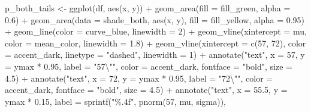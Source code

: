 \documentclass[
  letterpaper,
  DIV=11,
  numbers=noendperiod]{scrreprt}
\newenvironment{Shaded}{\begin{snugshade}}{\end{snugshade}}
\newcommand{\AttributeTok}[1]{\textcolor[rgb]{0.40,0.45,0.13}{#1}}
\newcommand{\DecValTok}[1]{\textcolor[rgb]{0.68,0.00,0.00}{#1}}
\newcommand{\FloatTok}[1]{\textcolor[rgb]{0.68,0.00,0.00}{#1}}
\newcommand{\FunctionTok}[1]{\textcolor[rgb]{0.28,0.35,0.67}{#1}}
\newcommand{\NormalTok}[1]{\textcolor[rgb]{0.00,0.23,0.31}{#1}}
\newcommand{\OtherTok}[1]{\textcolor[rgb]{0.00,0.23,0.31}{#1}}
\newcommand{\SpecialCharTok}[1]{\textcolor[rgb]{0.37,0.37,0.37}{#1}}
\newcommand{\StringTok}[1]{\textcolor[rgb]{0.13,0.47,0.30}{#1}}
\begin{document}
\begin{Shaded}
\begin{Highlighting}[]
\NormalTok{p\_both\_tails }\OtherTok{\textless{}{-}} \FunctionTok{ggplot}\NormalTok{(df, }\FunctionTok{aes}\NormalTok{(x, y)) }\SpecialCharTok{+}
  \FunctionTok{geom\_area}\NormalTok{(}\AttributeTok{fill =}\NormalTok{ fill\_green, }\AttributeTok{alpha =} \FloatTok{0.6}\NormalTok{) }\SpecialCharTok{+}
  \FunctionTok{geom\_area}\NormalTok{(}\AttributeTok{data =}\NormalTok{ shade\_both, }\FunctionTok{aes}\NormalTok{(x, y), }\AttributeTok{fill =}\NormalTok{ fill\_yellow, }\AttributeTok{alpha =} \FloatTok{0.95}\NormalTok{) }\SpecialCharTok{+}
  \FunctionTok{geom\_line}\NormalTok{(}\AttributeTok{color =}\NormalTok{ curve\_blue, }\AttributeTok{linewidth =} \DecValTok{2}\NormalTok{) }\SpecialCharTok{+}
  \FunctionTok{geom\_vline}\NormalTok{(}\AttributeTok{xintercept =}\NormalTok{ mu, }\AttributeTok{color =}\NormalTok{ mean\_color, }\AttributeTok{linewidth =} \FloatTok{1.8}\NormalTok{) }\SpecialCharTok{+}
  \FunctionTok{geom\_vline}\NormalTok{(}\AttributeTok{xintercept =} \FunctionTok{c}\NormalTok{(}\DecValTok{57}\NormalTok{, }\DecValTok{72}\NormalTok{), }\AttributeTok{color =}\NormalTok{ accent\_dark, }
             \AttributeTok{linetype =} \StringTok{"dashed"}\NormalTok{, }\AttributeTok{linewidth =} \DecValTok{1}\NormalTok{) }\SpecialCharTok{+}
  \FunctionTok{annotate}\NormalTok{(}\StringTok{"text"}\NormalTok{, }\AttributeTok{x =} \DecValTok{57}\NormalTok{, }\AttributeTok{y =}\NormalTok{ ymax }\SpecialCharTok{*} \FloatTok{0.95}\NormalTok{, }\AttributeTok{label =} \StringTok{"57}\SpecialCharTok{\textbackslash{}"}\StringTok{"}\NormalTok{, }
           \AttributeTok{color =}\NormalTok{ accent\_dark, }\AttributeTok{fontface =} \StringTok{"bold"}\NormalTok{, }\AttributeTok{size =} \FloatTok{4.5}\NormalTok{) }\SpecialCharTok{+}
  \FunctionTok{annotate}\NormalTok{(}\StringTok{"text"}\NormalTok{, }\AttributeTok{x =} \DecValTok{72}\NormalTok{, }\AttributeTok{y =}\NormalTok{ ymax }\SpecialCharTok{*} \FloatTok{0.95}\NormalTok{, }\AttributeTok{label =} \StringTok{"72}\SpecialCharTok{\textbackslash{}"}\StringTok{"}\NormalTok{, }
           \AttributeTok{color =}\NormalTok{ accent\_dark, }\AttributeTok{fontface =} \StringTok{"bold"}\NormalTok{, }\AttributeTok{size =} \FloatTok{4.5}\NormalTok{) }\SpecialCharTok{+}
  \FunctionTok{annotate}\NormalTok{(}\StringTok{"text"}\NormalTok{, }\AttributeTok{x =} \FloatTok{55.5}\NormalTok{, }\AttributeTok{y =}\NormalTok{ ymax }\SpecialCharTok{*} \FloatTok{0.15}\NormalTok{, }
           \AttributeTok{label =} \FunctionTok{sprintf}\NormalTok{(}\StringTok{"\%.4f"}\NormalTok{, }\FunctionTok{pnorm}\NormalTok{(}\DecValTok{57}\NormalTok{, mu, sigma)), }

\end{Highlighting}
\end{Shaded}
\end{document}
